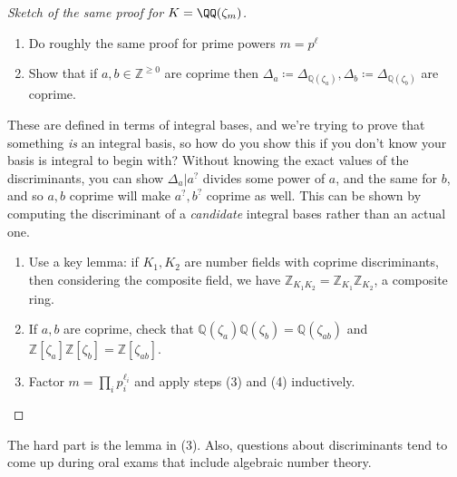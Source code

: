 \begin{proof}[Sketch of the same proof for $K = \QQ(\zeta_m)$]

\envlist

\begin{enumerate}
\def\labelenumi{\arabic{enumi}.}
\item
  Do roughly the same proof for prime powers \(m = p^\ell\)
\item
  Show that if \(a, b\in {\mathbb{Z}}^{\geq 0}\) are coprime then
  \({\Delta}_a \coloneqq{\Delta}_{{\mathbb{Q}}( \zeta_a)}, {\Delta}_b \coloneqq{\Delta}_{{\mathbb{Q}}(\zeta_b)}\)
  are coprime.
\end{enumerate}

These are defined in terms of integral bases, and we're trying to prove
that something \emph{is} an integral basis, so how do you show this if
you don't know your basis is integral to begin with? Without knowing the
exact values of the discriminants, you can show
\({\Delta}_a \mathrel{\Big|}a^?\) divides some power of \(a\), and the
same for \(b\), and so \(a, b\) coprime will make \(a^?, b^?\) coprime
as well. This can be shown by computing the discriminant of a
\emph{candidate} integral bases rather than an actual one.

\begin{enumerate}
\def\labelenumi{\arabic{enumi}.}
\setcounter{enumi}{2}
\item
  Use a key lemma: if \(K_1, K_2\) are number fields with coprime
  discriminants, then considering the composite field, we have
  \({\mathbb{Z}}_{K_1 K_2} = {\mathbb{Z}}_{K_1} {\mathbb{Z}}_{K_2}\), a
  composite ring.
\item
  If \(a, b\) are coprime, check that
  \({\mathbb{Q}}(\zeta_a) {\mathbb{Q}}(\zeta_b) = {\mathbb{Q}}(\zeta_{ab})\)
  and
  \({\mathbb{Z}}[ \zeta_a] {\mathbb{Z}}[ \zeta_b] = {\mathbb{Z}}[ \zeta_{ab} ]\).
\item
  Factor \(m = \prod_{i} p_i^{\ell_i}\) and apply steps (3) and (4)
  inductively.
\end{enumerate}

\end{proof}

\begin{remark}

The hard part is the lemma in (3). Also, questions about discriminants
tend to come up during oral exams that include algebraic number theory.

\end{remark}

